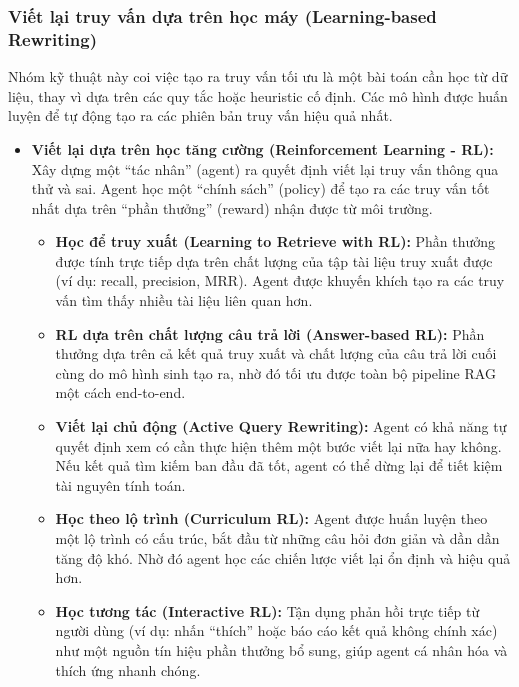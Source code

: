 \subsubsection{Viết lại truy vấn dựa trên học máy (Learning-based Rewriting)}
\label{sssec:learning_based_rewriting}
Nhóm kỹ thuật này coi việc tạo ra truy vấn tối ưu là một bài toán cần học từ dữ liệu, thay vì dựa trên các quy tắc hoặc heuristic cố định. Các mô hình được huấn luyện để tự động tạo ra các phiên bản truy vấn hiệu quả nhất.

\begin{itemize}
	\item \textbf{Viết lại dựa trên học tăng cường (Reinforcement Learning - RL):}
	Xây dựng một “tác nhân” (agent) ra quyết định viết lại truy vấn thông qua thử và sai. Agent học một “chính sách” (policy) để tạo ra các truy vấn tốt nhất dựa trên “phần thưởng” (reward) nhận được từ môi trường.
	\begin{itemize}
		\item \textbf{Học để truy xuất (Learning to Retrieve with RL):}
		Phần thưởng được tính trực tiếp dựa trên chất lượng của tập tài liệu truy xuất được (ví dụ: recall, precision, MRR). Agent được khuyến khích tạo ra các truy vấn tìm thấy nhiều tài liệu liên quan hơn.
		
		\item \textbf{RL dựa trên chất lượng câu trả lời (Answer-based RL):}
		Phần thưởng dựa trên cả kết quả truy xuất và chất lượng của câu trả lời cuối cùng do mô hình sinh tạo ra, nhờ đó tối ưu được toàn bộ pipeline RAG một cách end-to-end.

		\item \textbf{Viết lại chủ động (Active Query Rewriting):}
		Agent có khả năng tự quyết định xem có cần thực hiện thêm một bước viết lại nữa hay không. Nếu kết quả tìm kiếm ban đầu đã tốt, agent có thể dừng lại để tiết kiệm tài nguyên tính toán.
		
		\item \textbf{Học theo lộ trình (Curriculum RL):}
		Agent được huấn luyện theo một lộ trình có cấu trúc, bắt đầu từ những câu hỏi đơn giản và dần dần tăng độ khó. Nhờ đó agent học các chiến lược viết lại ổn định và hiệu quả hơn.

		\item \textbf{Học tương tác (Interactive RL):}
		Tận dụng phản hồi trực tiếp từ người dùng (ví dụ: nhấn “thích” hoặc báo cáo kết quả không chính xác) như một nguồn tín hiệu phần thưởng bổ sung, giúp agent cá nhân hóa và thích ứng nhanh chóng.
		

\end{itemize}
\end{itemize}
